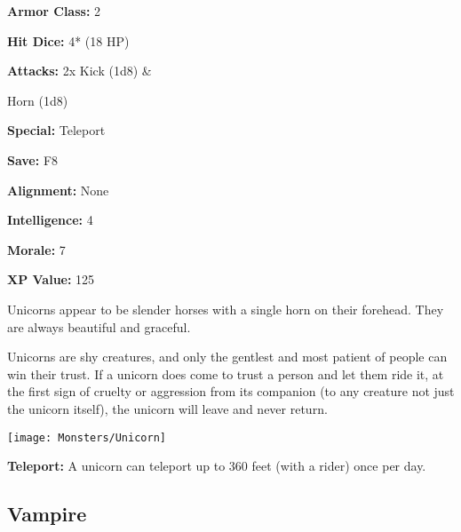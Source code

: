 \begin{multicols*}{2}
{\textbf{Armor Class:} 2

\textbf{Hit Dice:} 4* (18 HP)

\textbf{Attacks:} 2x Kick (1d8) \& 

Horn (1d8)

\textbf{Special:} Teleport

\textbf{Save:} F8

\textbf{Alignment:} None

\textbf{Intelligence:} 4

\textbf{Morale:} 7

\textbf{XP Value:} 125}

Unicorns appear to be slender horses with a single horn on their forehead. They are always beautiful and graceful.

Unicorns are shy creatures, and only the gentlest and most patient of people can win their trust. If a unicorn does come to trust a person and let them ride it, at the first sign of cruelty or aggression from its companion (to any creature not just the unicorn itself), the unicorn will leave and never return.

\texttt{[image: Monsters/Unicorn]}

\textbf{Teleport:} A unicorn can teleport up to 360 feet (with a rider) once per day.

\subsection{Vampire}
\end{multicols*}
